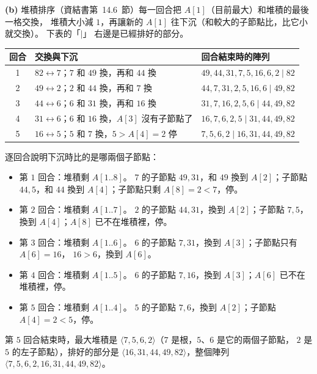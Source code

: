\begin{pastsoln}
\textbf{(b)} 堆積排序（資結書第~14.6~節）每一回合把 $A[1]$（目前最大）和堆積的最後一格交換，
堆積大小減 $1$，再讓新的 $A[1]$ 往下沉（和較大的子節點比，比它小就交換）。 下表的「$\mid$」
右邊是已經排好的部分。

\begin{center}
\small
\begin{tabular}{cll}
\toprule
回合 & 交換與下沉 & 回合結束時的陣列 \\
\midrule
1 & $82 \leftrightarrow 7$；$7$ 和 $49$ 換，再和 $44$ 換 & $49, 44, 31, 7, 5, 16, 6, 2 \mid 82$ \\
2 & $49 \leftrightarrow 2$；$2$ 和 $44$ 換，再和 $7$ 換 & $44, 7, 31, 2, 5, 16, 6 \mid 49, 82$ \\
3 & $44 \leftrightarrow 6$；$6$ 和 $31$ 換，再和 $16$ 換 & $31, 7, 16, 2, 5, 6 \mid 44, 49, 82$ \\
4 & $31 \leftrightarrow 6$；$6$ 和 $16$ 換，$A[3]$ 沒有子節點了 & $16, 7, 6, 2, 5 \mid 31, 44, 49, 82$ \\
5 & $16 \leftrightarrow 5$；$5$ 和 $7$ 換，$5 > A[4] = 2$ 停 & $7, 5, 6, 2 \mid 16, 31, 44, 49, 82$ \\
\bottomrule
\end{tabular}
\end{center}

逐回合說明下沉時比的是哪兩個子節點：
\begin{itemize}
\item 第 $1$ 回合：堆積剩 $A[1..8]$。 $7$ 的子節點 $49, 31$，和 $49$ 換到 $A[2]$；子節點
$44, 5$，和 $44$ 換到 $A[4]$；子節點只剩 $A[8] = 2 < 7$，停。
\item 第 $2$ 回合：堆積剩 $A[1..7]$。 $2$ 的子節點 $44, 31$，換到 $A[2]$；子節點 $7, 5$，換到
$A[4]$；$A[8]$ 已不在堆積裡，停。
\item 第 $3$ 回合：堆積剩 $A[1..6]$。 $6$ 的子節點 $7, 31$，換到 $A[3]$；子節點只有 $A[6] = 16$，
$16 > 6$，換到 $A[6]$。
\item 第 $4$ 回合：堆積剩 $A[1..5]$。 $6$ 的子節點 $7, 16$，換到 $A[3]$；$A[6]$ 已不在堆積裡，停。
\item 第 $5$ 回合：堆積剩 $A[1..4]$。 $5$ 的子節點 $7, 6$，換到 $A[2]$；子節點 $A[4] = 2 < 5$，停。
\end{itemize}

第 $5$ 回合結束時，最大堆積是 $\langle 7, 5, 6, 2\rangle$（$7$ 是根，$5$、$6$ 是它的兩個子節點，
$2$ 是 $5$ 的左子節點），排好的部分是 $\langle 16, 31, 44, 49, 82\rangle$，整個陣列
$\langle 7, 5, 6, 2, 16, 31, 44, 49, 82\rangle$。
\end{pastsoln}
